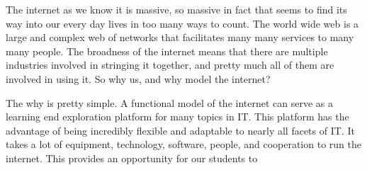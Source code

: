 \documentclass[12pt]{article}
\begin{document}
The internet as we know it is massive, so massive in fact that seems to find its way into our every day lives in too many ways to count. The world wide web is
a large and complex web of networks that facilitates many many services to many many people. The broadness of the internet means that there are multiple industries
involved in stringing it together, and pretty much all of them are involved in using it. So why us, and why model the internet? 

The why is pretty simple. A functional model of the internet can serve as a learning end exploration platform for many topics in IT. This platform has the advantage 
of being incredibly flexible and adaptable to nearly all facets of IT. It takes a lot of equipment, technology, software, people, and cooperation to run the internet. 
This provides an opportunity for our students to  
\end{document}
